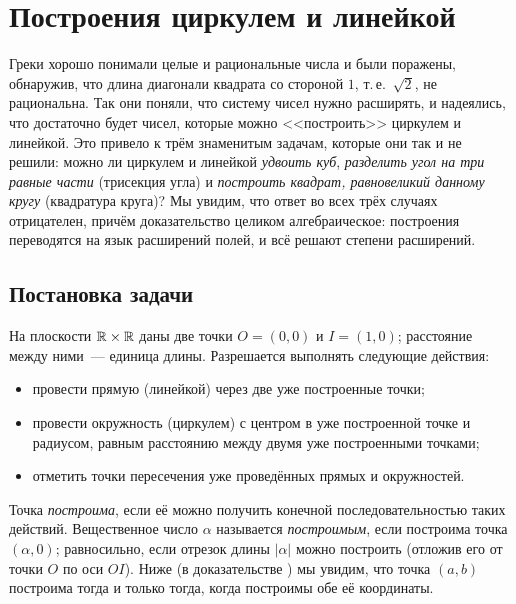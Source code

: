 \makeatletter
{}
\makeatother
\section{Построения циркулем и линейкой}

Греки хорошо понимали целые и рациональные числа и были поражены, обнаружив, что длина диагонали квадрата со
стороной $1$, т.\,е.\ $\sqrt2$, не рациональна. Так они поняли, что систему чисел нужно расширять, и надеялись, что
достаточно будет чисел, которые можно <<построить>> циркулем и линейкой. Это привело к трём знаменитым задачам,
которые они так и не решили: можно ли циркулем и линейкой \emph{удвоить куб}, \emph{разделить угол на три равные
части} (трисекция угла) и \emph{построить квадрат, равновеликий данному кругу} (квадратура круга)? Мы увидим, что ответ во
всех трёх случаях отрицателен, причём доказательство целиком алгебраическое: построения переводятся на язык
расширений полей, и всё решают степени расширений.

\subsection*{Постановка задачи}

На плоскости $\mathbb R\times\mathbb R$ даны две точки $O=(0,0)$ и $I=(1,0)$; расстояние между ними~--- единица длины. Разрешается
выполнять следующие действия:
\begin{itemize}
\item провести прямую (линейкой) через две уже построенные точки;
\item провести окружность (циркулем) с центром в уже построенной точке и радиусом, равным расстоянию между двумя уже
построенными точками;
\item отметить точки пересечения уже проведённых прямых и окружностей.
\end{itemize}
Точка \emph{построима}, если её можно получить конечной последовательностью таких действий. Вещественное число $\alpha$
называется \emph{построимым}, если построима точка $(\alpha,0)$; равносильно, если отрезок длины $|\alpha|$ можно
построить (отложив его от точки $O$ по оси $OI$). Ниже (в доказательстве ) мы увидим, что точка $(a,b)$
построима тогда и только тогда, когда построимы обе её координаты.

